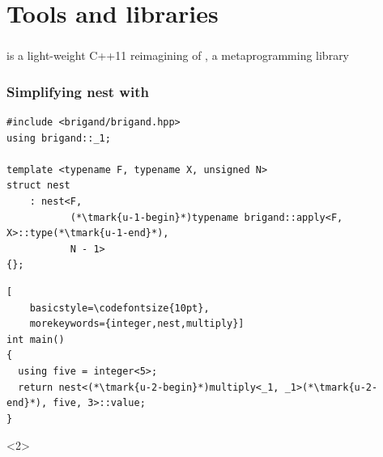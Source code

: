 \documentclass[14pt]{beamer}
\begin{document}
\section{Tools and libraries}
\frame{\sectionpage}

\begin{frame}
  \frametitle{}

   is a light-weight C++11 reimagining of
  , a metaprogramming library

  \vspace{.5cm}


\end{frame}

\begin{frame}[fragile]
  \frametitle{Simplifying nest with }
  
  \begin{lstlisting}[basicstyle=\codefontsize{10pt}]
#include <brigand/brigand.hpp>
using brigand::_1;

template <typename F, typename X, unsigned N>
struct nest
    : nest<F,
           (*\tmark{u-1-begin}*)typename brigand::apply<F, X>::type(*\tmark{u-1-end}*),
           N - 1>
{};
  \end{lstlisting}

  \begin{lstlisting}[
    basicstyle=\codefontsize{10pt},
    morekeywords={integer,nest,multiply}]
int main()
{
  using five = integer<5>;
  return nest<(*\tmark{u-2-begin}*)multiply<_1, _1>(*\tmark{u-2-end}*), five, 3>::value;
}
  \end{lstlisting}

  \begin{onlyenv}<2>
    \nointerlineskip
  \end{onlyenv}
\end{frame}
\end{document}
